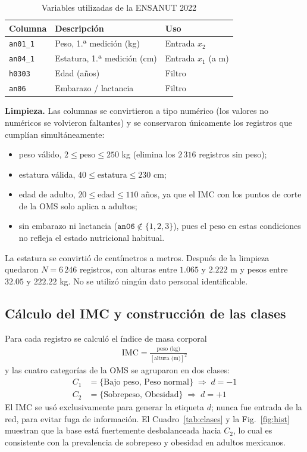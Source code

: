 \documentclass[conference]{IEEEtran}
\begin{document}
\begin{table}[htbp]
\caption{Variables utilizadas de la ENSANUT 2022}
\label{tab:vars}
\begin{center}
\begin{tabular}{lll}
\toprule
\textbf{Columna} & \textbf{Descripción} & \textbf{Uso} \\
\midrule
\texttt{an01\_1} & Peso, 1.ª medición (kg)      & Entrada $x_2$ \\
\texttt{an04\_1} & Estatura, 1.ª medición (cm)  & Entrada $x_1$ (a m) \\
\texttt{h0303}   & Edad (años)                  & Filtro \\
\texttt{an06}    & Embarazo / lactancia         & Filtro \\
\bottomrule
\end{tabular}
\end{center}
\end{table}

\textbf{Limpieza.} Las columnas se convirtieron a tipo numérico (los valores no
numéricos se volvieron faltantes) y se conservaron únicamente los registros que
cumplían simultáneamente:
\begin{itemize}
    \item peso válido, $2\leq\text{peso}\leq250$ kg (elimina los $2\,316$ registros sin peso);
    \item estatura válida, $40\leq\text{estatura}\leq230$ cm;
    \item edad de adulto, $20\leq\text{edad}\leq110$ años, ya que el IMC con
    los puntos de corte de la OMS solo aplica a adultos;
    \item sin embarazo ni lactancia ($\texttt{an06}\notin\{1,2,3\}$), pues el
    peso en estas condiciones no refleja el estado nutricional habitual.
\end{itemize}
La estatura se convirtió de centímetros a metros. Después de la limpieza
quedaron $N=6\,246$ registros, con alturas entre $1.065$ y $2.222$ m y pesos
entre $32.05$ y $222.22$ kg. No se utilizó ningún dato personal identificable.

\subsection{Cálculo del IMC y construcción de las clases}
Para cada registro se calculó el índice de masa corporal
\begin{align}
    \label{eq:imc}
    \text{IMC}=\frac{\text{peso (kg)}}{[\text{altura (m)}]^2}
\end{align}
y las cuatro categorías de la OMS se agruparon en dos clases:
\begin{align}
    C_1 &= \{\text{Bajo peso, Peso normal}\} \;\Rightarrow\; d=-1\\
    C_2 &= \{\text{Sobrepeso, Obesidad}\} \;\Rightarrow\; d=+1
\end{align}
El IMC se usó exclusivamente para generar la etiqueta $d$; nunca fue entrada
de la red, para evitar fuga de información. El Cuadro~\ref{tab:clases} y la
Fig.~\ref{fig:hist} muestran que la base está fuertemente desbalanceada hacia
$C_2$, lo cual es consistente con la prevalencia de sobrepeso y obesidad en
adultos mexicanos.
\end{document}
